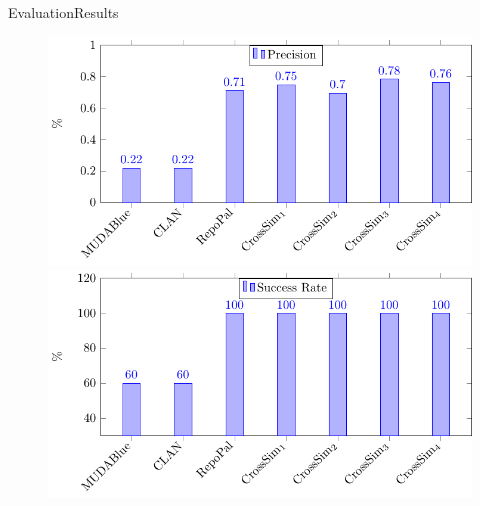 \documentclass{beamer}
\begin{document}
\begin{frame}{Evaluation}{Results}
\begin{figure}[!tbp]
  \centering
  \begin{minipage}[b]{0.45\textwidth}
    \includegraphics[width=\textwidth]{images/Precision.pdf}
  \end{minipage}
  \hfill
  \begin{minipage}[b]{0.45\textwidth}
    \includegraphics[width=\textwidth]{images/SuccessRate.pdf}
  \end{minipage}
\end{figure}
\end{frame}
\end{document}
